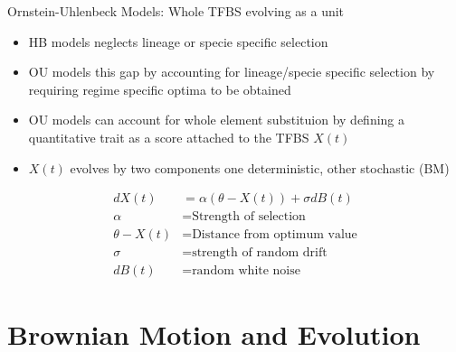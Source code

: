 \begin{frame}[fragile]{Ornstein-Uhlenbeck Models: Whole TFBS evolving as a unit}
\begin{itemize}
\item HB models neglects lineage or specie specific selection
\item OU models this gap by accounting for lineage/specie specific selection by requiring regime specific optima to be obtained
\item OU models can account for whole element substituion by defining a quantitative trait as a score attached to the TFBS $X(t)$
\item $X(t)$ evolves by two components one deterministic, other stochastic (BM)
\end{itemize}
\begin{align*}
dX(t) &= \alpha(\theta-X(t)) + \sigma dB(t)\\
\alpha & = \text{Strength of selection}\\
\theta - X(t) & = \text{Distance from optimum value}\\
\sigma &= \text{strength of random drift}\\
dB(t) &= \text{random white noise}
\end{align*}
\end{frame}




\section{Brownian Motion and Evolution}


